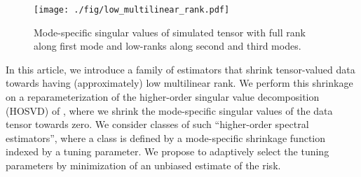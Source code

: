 \begin{figure}
\begin{center}
\texttt{[image: ./fig/low\_multilinear\_rank.pdf]}
\caption{Mode-specific singular values of simulated tensor with full
  rank along first mode and low-ranks along second and third modes.}
\label{fig:sim.extreme}
\end{center}
\end{figure}






In this article, we introduce a family of estimators that shrink
tensor-valued data towards having (approximately) low multilinear
rank. We perform this shrinkage on a reparameterization of the
higher-order singular value decomposition (HOSVD) of
\cite{de2000multilinear}, where we shrink the mode-specific singular
values of the data tensor towards zero. We consider classes of such
``higher-order spectral estimators'', where a class is defined by a
mode-specific shrinkage function indexed by a tuning parameter. We
propose to adaptively select the tuning parameters by minimization of
an unbiased estimate of the risk.



